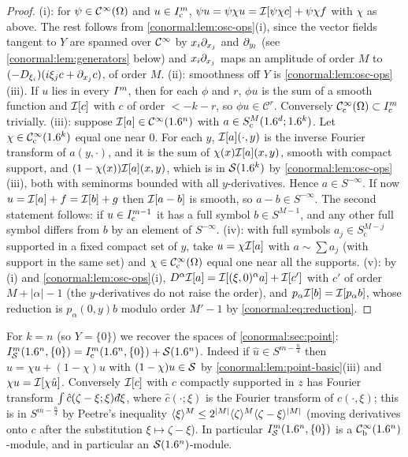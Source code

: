 \begin{proof}
  (i): for $\psi\in\mathcal{C}^\infty(\Omega)$ and $u\in I^{m}_{\mathrm c}$,
  $\psi u=\psi\chi u=\mathcal{I}[\psi\chi c]+\psi\chi f$ with $\chi$ as above.  The rest
  follows from \cref{conormal:lem:osc-ops}(i), since the vector fields tangent
  to $Y$ are spanned over $\mathcal{C}^\infty$ by $x_i\partial_{x_j}$ and $\partial_{y_l}$ (see
  \cref{conormal:lem:generators} below) and $x_i\partial_{x_j}$ maps an amplitude of
  order $M$ to $(-D_{\xi_i})(i\xi_jc+\partial_{x_j}c)$, of order $M$.
  (ii): smoothness off $Y$ is \cref{conormal:lem:osc-ops}(iii).  If $u$ lies in
  every $I^{m}$, then for each $\phi$ and $r$, $\phi u$ is the sum of a smooth
  function and $\mathcal{I}[c]$ with $c$ of order $<-k-r$, so $\phi u\in\mathcal C^r$.
  Conversely $\mathcal{C}^\infty_{\mathrm{c}}(\Omega)\subset I^{m}_{\mathrm c}$ trivially.
  (iii): suppose $\mathcal{I}[a]\in\mathcal{C}^\infty(1.6^n)$ with $a\in S^M_{\mathrm c}(1.6^d;1.6^k)$.
  Let $\chi\in\mathcal{C}^\infty_{\mathrm{c}}(1.6^k)$ equal one near $0$.  For each $y$, $\mathcal{I}[a](\cdot,y)$
  is the inverse Fourier transform of $a(y,\cdot)$, and it is the sum of
  $\chi(x)\mathcal{I}[a](x,y)$, smooth with compact support, and
  $(1-\chi(x))\mathcal{I}[a](x,y)$, which is in $\mathcal{S}(1.6^k)$ by
  \cref{conormal:lem:osc-ops}(iii), both with seminorms bounded with all
  $y$-derivatives.  Hence $a\in S^{-\infty}$.  If now $u=\mathcal{I}[a]+f=\mathcal{I}[b]+g$
  then $\mathcal{I}[a-b]$ is smooth, so $a-b\in S^{-\infty}$.  The second statement
  follows: if $u\in I^{m-1}_{\mathrm c}$ it has a full symbol $b\in S^{M-1}$, and
  any other full symbol differs from $b$ by an element of $S^{-\infty}$.
  (iv): with full symbols $a_j\in S^{M-j}_{\mathrm c}$ supported in a fixed
  compact set of $y$, take $u=\chi\mathcal{I}[a]$ with $a\sim\sum a_j$ (with support in
  the same set) and $\chi\in\mathcal{C}^\infty_{\mathrm{c}}(\Omega)$ equal one near all the supports.
  (v): by (i) and \cref{conormal:lem:osc-ops}(i), $D^\alpha\mathcal{I}[a]=\mathcal{I}[(\xi,0)^\alpha
  a]+\mathcal{I}[c']$ with $c'$ of order $M+|\alpha|-1$ (the $y$-derivatives do not
  raise the order), and $p_\alpha\mathcal{I}[b]=\mathcal{I}[p_\alpha b]$, whose reduction is
  $p_\alpha(0,y)b$ modulo order $M'-1$ by \eqref{conormal:eq:reduction}.
\end{proof}

\begin{remark}\label{conormal:rem:point-local}
  For $k=n$ (so $Y=\{0\}$) we recover the spaces of \cref{conormal:sec:point}:
  $I^{m}_{\mathcal{S}}(1.6^n,\{0\})=I^{m}_{\mathrm c}(1.6^n,\{0\})+\mathcal{S}(1.6^n)$.  Indeed if
  $\hat u\in S^{m-\frac n4}$ then $u=\chi u+(1-\chi)u$ with $(1-\chi)u\in\mathcal{S}$ by
  \cref{conormal:lem:point-basic}(iii) and $\chi u=\mathcal{I}[\chi\hat u]$.  Conversely
  $\mathcal{I}[c]$ with $c$ compactly supported in $z$ has Fourier transform
  $\int\hat c(\zeta-\xi;\xi)\,\dbar\xi$, where $\hat c(\cdot;\xi)$ is the Fourier
  transform of $c(\cdot,\xi)$; this is in $S^{m-\frac n4}$ by Peetre's inequality
  $\langle \xi\rangle^{M}\le2^{|M|}\langle \zeta\rangle^M\langle \zeta-\xi\rangle^{|M|}$ (moving derivatives
  onto $c$ after the substitution $\xi\mapsto\zeta-\xi$).  In particular
  $I^{m}_{\mathcal{S}}(1.6^n,\{0\})$ is a $\mathcal{C}^\infty_{\mathrm{b}}(1.6^n)$-module, and in particular an
  $\mathcal{S}(1.6^n)$-module.
\end{remark}

